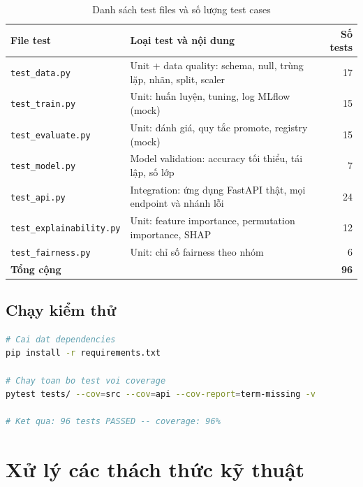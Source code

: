 \documentclass[12pt,a4paper]{report}
\begin{document}
\begin{table}[H]
  \centering
  \caption{Danh sách test files và số lượng test cases}
  \label{tab:tests}
  \begin{tabularx}{\textwidth}{lXr}
    \toprule
    \textbf{File test} & \textbf{Loại test và nội dung} & \textbf{Số tests} \\
    \midrule
    \texttt{test\_data.py}           & Unit + data quality: schema, null, trùng lặp, nhãn, split, scaler & 17 \\
    \texttt{test\_train.py}          & Unit: huấn luyện, tuning, log MLflow (mock)                       & 15 \\
    \texttt{test\_evaluate.py}       & Unit: đánh giá, quy tắc promote, registry (mock)                  & 15 \\
    \texttt{test\_model.py}          & Model validation: accuracy tối thiểu, tái lập, số lớp             & 7  \\
    \texttt{test\_api.py}            & Integration: ứng dụng FastAPI thật, mọi endpoint và nhánh lỗi     & 24 \\
    \texttt{test\_explainability.py} & Unit: feature importance, permutation importance, SHAP            & 12 \\
    \texttt{test\_fairness.py}       & Unit: chỉ số fairness theo nhóm                                   & 6  \\
    \midrule
    \textbf{Tổng cộng} & & \textbf{96} \\
    \bottomrule
  \end{tabularx}
\end{table}

\subsection{Chạy kiểm thử}

\begin{lstlisting}[language=bash, caption=Chạy bộ test với coverage report]
# Cai dat dependencies
pip install -r requirements.txt

# Chay toan bo test voi coverage
pytest tests/ --cov=src --cov=api --cov-report=term-missing -v

# Ket qua: 96 tests PASSED -- coverage: 96%
\end{lstlisting}

\section{Xử lý các thách thức kỹ thuật}
\end{document}
